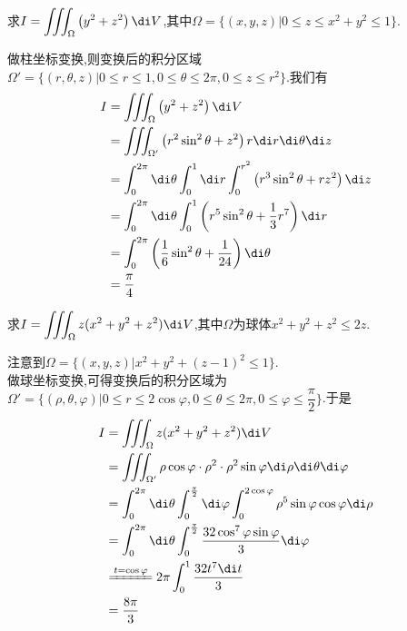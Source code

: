 \documentclass{ctexart}
\begin{document}
\pagestyle{empty}
\begin{center}
    \large{}
\end{center}
\begin{problem}[L.3.1]
    求$I=\displaystyle\iiint_\Omega\left(y^2+z^2\right)\di V$,其中$\Omega=\{(x,y,z)|0\leqslant z\leqslant x^2+y^2\leqslant 1\}$.
\end{problem}
\begin{solution}
    做柱坐标变换,则变换后的积分区域$\Omega'=\{(r,\theta,z)|0\leqslant r\leqslant 1,0\leqslant\theta\leqslant2\pi,0\leqslant z\leqslant r^2\}$.我们有
    \[\begin{aligned}
        I
        &= \iiint_{\Omega}\left(y^2+z^2\right)\di V \\
        &= \iiint_{\Omega'}\left(r^2\sin^2\theta+z^2\right)r\di r\di\theta\di z \\
        &= \int_0^{2\pi}\di\theta\int_0^1\di r\int_0^{r^2}\left(r^3\sin^2\theta+rz^2\right)\di z \\
        &= \int_0^{2\pi}\di\theta\int_0^1\left(r^5\sin^2\theta+\dfrac13r^7\right)\di r \\
        &= \int_0^{2\pi}\left(\dfrac16\sin^2\theta+\dfrac{1}{24}\right)\di\theta \\
        &= \dfrac{\pi}{4}
    \end{aligned}\]
\end{solution}
\begin{problem}[L.3.2]
    求$I=\displaystyle\iiint_{\Omega}z(x^2+y^2+z^2)\di V$,其中$\Omega$为球体$x^2+y^2+z^2\leqslant2z$.
\end{problem}
\begin{solution}
    注意到$\Omega=\{(x,y,z)|x^2+y^2+(z-1)^2\leqslant 1\}$.\\
    做球坐标变换,可得变换后的积分区域为$\Omega'=\{(\rho,\theta,\varphi)|0\leqslant r\leqslant2\cos\varphi,0\leqslant\theta\leqslant2\pi,0\leqslant\varphi\leqslant\dfrac{\pi}{2}\}$.于是
    \[\begin{aligned}
        I
        &= \iiint_{\Omega}z(x^2+y^2+z^2)\di V \\
        &= \iiint_{\Omega'}\rho\cos\varphi\cdot\rho^2\cdot\rho^2\sin\varphi\di\rho\di\theta\di\varphi \\
        &= \int_0^{2\pi}\di\theta\int_0^{\frac\pi2}\di\varphi\int_0^{2\cos\varphi}\rho^5\sin\varphi\cos\varphi\di\rho \\
        &= \int_0^{2\pi}\di\theta\int_0^{\frac\pi2}\dfrac{32\cos^7\varphi\sin\varphi}{3}\di\varphi \\
        &\xlongequal{t=\cos\varphi}2\pi\int_{0}^{1}\dfrac{32t^7\di t}{3} \\
        &= \dfrac{8\pi}{3}
    \end{aligned}\]
\end{solution}
\end{document}

